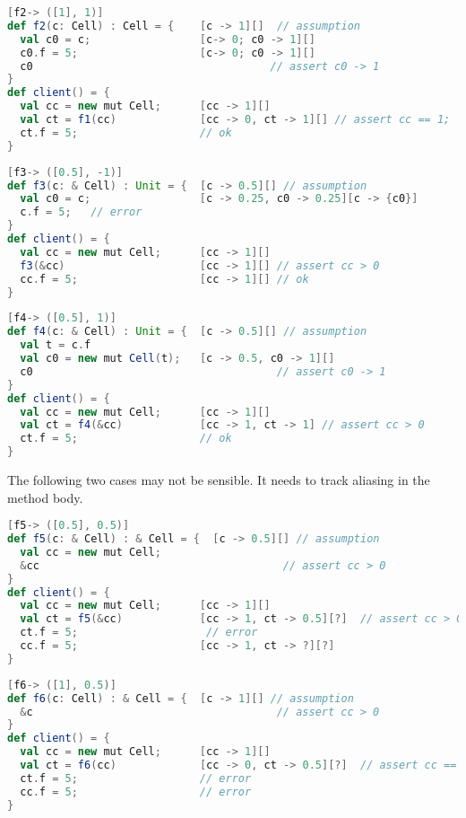 \begin{lstlisting}[language=Scala,basicstyle=\footnotesize\ttfamily]
[f2-> ([1], 1)] 
def f2(c: Cell) : Cell = {    [c -> 1][]  // assumption
  val c0 = c;                 [c-> 0; c0 -> 1][]
  c0.f = 5;                   [c-> 0; c0 -> 1][]
  c0                                     // assert c0 -> 1
}    
def client() = {
  val cc = new mut Cell;      [cc -> 1][]
  val ct = f1(cc)             [cc -> 0, ct -> 1][] // assert cc == 1; 
  ct.f = 5;                   // ok   
}
\end{lstlisting}

\begin{lstlisting}[language=Scala,basicstyle=\footnotesize\ttfamily]
[f3-> ([0.5], -1)] 
def f3(c: & Cell) : Unit = {  [c -> 0.5][] // assumption
  val c0 = c;                 [c -> 0.25, c0 -> 0.25][c -> {c0}]
  c.f = 5;   // error         
}
def client() = {
  val cc = new mut Cell;      [cc -> 1][]
  f3(&cc)                     [cc -> 1][] // assert cc > 0
  cc.f = 5;                   [cc -> 1][] // ok
}  
\end{lstlisting}

\begin{lstlisting}[language=Scala,basicstyle=\footnotesize\ttfamily]
[f4-> ([0.5], 1)] 
def f4(c: & Cell) : Unit = {  [c -> 0.5][] // assumption
  val t = c.f
  val c0 = new mut Cell(t);   [c -> 0.5, c0 -> 1][]
  c0                                      // assert c0 -> 1 
}
def client() = {
  val cc = new mut Cell;      [cc -> 1][]
  val ct = f4(&cc)            [cc -> 1, ct -> 1] // assert cc > 0
  ct.f = 5;                   // ok
}  
\end{lstlisting}

The following two cases may not be sensible. It needs to track aliasing in the method body.
\begin{lstlisting}[language=Scala,basicstyle=\footnotesize\ttfamily]
[f5-> ([0.5], 0.5)] 
def f5(c: & Cell) : & Cell = {  [c -> 0.5][] // assumption
  val cc = new mut Cell;
  &cc                                      // assert cc > 0
}
def client() = {
  val cc = new mut Cell;      [cc -> 1][]
  val ct = f5(&cc)            [cc -> 1, ct -> 0.5][?]  // assert cc > 0 
  ct.f = 5;                    // error
  cc.f = 5;                   [cc -> 1, ct -> ?][?]
}  
\end{lstlisting}

\begin{lstlisting}[language=Scala,basicstyle=\footnotesize\ttfamily]
[f6-> ([1], 0.5)] 
def f6(c: Cell) : & Cell = {  [c -> 1][] // assumption
  &c                                      // assert cc > 0
}
def client() = {
  val cc = new mut Cell;      [cc -> 1][]
  val ct = f6(cc)             [cc -> 0, ct -> 0.5][?]  // assert cc == 1
  ct.f = 5;                   // error
  cc.f = 5;                   // error
}  
\end{lstlisting}

